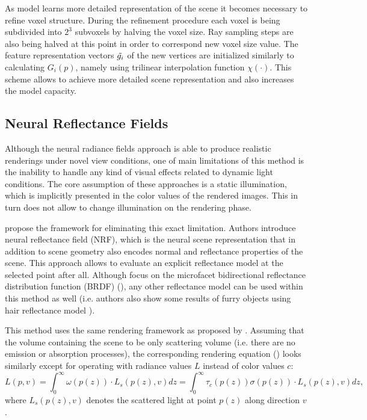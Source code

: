 As model learns more detailed representation of the scene it becomes necessary to refine voxel structure.
During the refinement procedure each voxel is being subdivided into $2^3$ subvoxels by halving the voxel size.
Ray sampling steps are also being halved at this point in order to correspond new voxel size value.
The feature representation vectors $\Tilde{g_i}$ of the new vertices are initialized similarly to calculating $G_i(p)$,
namely using trilinear interpolation function $\chi(\cdot)$.
This scheme allows to achieve more detailed scene representation
and also increases the model capacity.



\subsection{Neural Reflectance Fields}
\label{subsec:NRF}

Although the neural radiance fields approach is able to produce realistic renderings under novel view conditions,
one of main limitations of this method is the inability to handle any kind of visual effects related to dynamic light conditions.
The core assumption of these approaches is a static illumination,
which is implicitly presented in the color values of the rendered images.
This in turn does not allow to change illumination on the rendering phase.

\cite{bi2020neural} propose the framework for eliminating this exact limitation.
Authors introduce neural reflectance field (NRF), which is the neural scene representation
that in addition to scene geometry also encodes normal and reflectance properties of the scene.
This approach allows to evaluate an explicit reflectance model at the selected point after all.
Although \cite{bi2020neural} focus on the microfacet bidirectional reflectance distribution function (BRDF) (\cite{walter2007microfacet}),
any other reflectance model can be used within this method as well
(i.e. authors also show some results of furry objects using hair reflectance model \cite{kajiya1989fur}).

This method uses the same rendering framework as proposed by \cite{mildenhall2020nerf}.
Assuming that the volume containing the scene to be only scattering volume (i.e. there are no emission or absorption processes),
the corresponding rendering equation  (\cite{Novak18volumeSTAR}) looks similarly
except for operating with radiance values $L$ instead of color values $c$:
\begin{equation}
    L(p, v) = \int_0^\infty \omega(p(z)) \cdot L_s(p(z), v) dz = \int_0^\infty \tau_c(p(z)) \sigma(p(z)) \cdot L_s(p(z), v)dz,
\end{equation}
where $L_s(p(z), v)$ denotes the scattered light at point $p(z)$ along direction $v$.


